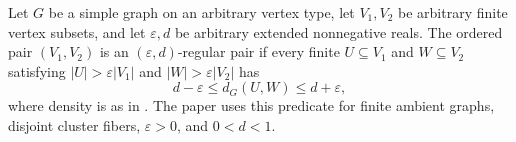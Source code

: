 \begin{definition}
Let $G$ be a simple graph on an arbitrary vertex type, let $V_1,V_2$ be arbitrary finite vertex subsets, and let $\varepsilon,d$ be arbitrary extended nonnegative reals.  The ordered pair $(V_1,V_2)$ is an $(\varepsilon,d)$-regular pair if every finite $U\subseteq V_1$ and $W\subseteq V_2$ satisfying $|U|>\varepsilon|V_1|$ and $|W|>\varepsilon|V_2|$ has
\[
d-\varepsilon\leq d_G(U,W)\leq d+\varepsilon,
\]
where density is as in .  The paper uses this predicate for finite ambient graphs, disjoint cluster fibers, $\varepsilon>0$, and $0<d<1$.
\end{definition}
